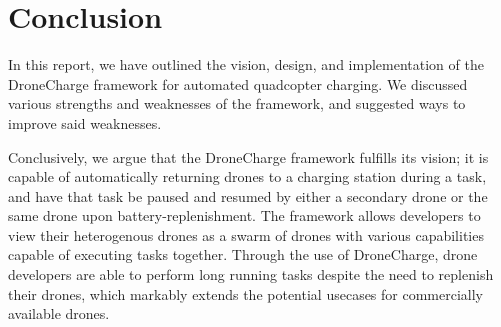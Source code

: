 \section{Conclusion}
In this report, we have outlined the vision, design, and implementation of the DroneCharge framework for automated quadcopter charging. We discussed various strengths and weaknesses of the framework, and 
suggested ways to improve said weaknesses.

Conclusively, we argue that the DroneCharge framework fulfills its vision; it is capable of automatically returning drones to a charging station during a task, and have that task be paused and resumed by either a secondary drone or the same drone upon battery-replenishment. The framework allows developers to view their heterogenous drones as a swarm of drones with various capabilities capable of executing tasks together. Through the use of DroneCharge, drone developers are able to perform long running tasks despite the need to replenish their drones, which markably extends the potential usecases for commercially available drones.